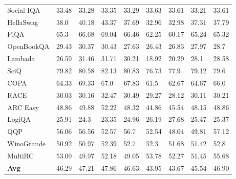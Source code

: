 \documentclass{article}
\theoremstyle{definition}
\theoremstyle{remark}
\begin{document}
\begin{table}[!ht]
\begin{tabular}{lllllllll}
        Social IQA & 33.48 & 33.28 & 33.35 & 33.29 & 33.63 & 33.61 & 33.21 & 33.61 \\ 
        HellaSwag & 38.0 & 40.18 & 43.37 & 37.69 & 32.96 & 32.98 & 37.31 & 37.79 \\ 
        PiQA & 65.3 & 66.68 & 69.04 & 66.46 & 62.25 & 60.17 & 65.24 & 65.32 \\ 
        OpenBookQA & 29.43 & 30.37 & 30.43 & 27.63 & 26.43 & 26.83 & 27.97 & 28.7 \\ 
        Lambada & 26.59 & 31.46 & 31.71 & 30.21 & 18.92 & 20.29 & 28.1 & 28.58 \\ 
        SciQ & 79.82 & 80.58 & 82.13 & 80.83 & 76.73 & 77.9 & 79.12 & 79.6 \\ 
        COPA & 64.33 & 69.33 & 67.0 & 67.83 & 61.5 & 62.67 & 64.67 & 66.0 \\ 
        RACE & 30.03 & 30.16 & 32.47 & 30.49 & 29.27 & 28.12 & 30.11 & 30.21 \\ 
        ARC Easy & 48.86 & 49.88 & 52.22 & 48.32 & 44.86 & 45.54 & 48.15 & 48.86 \\ 
        LogiQA & 25.91 & 24.3 & 23.35 & 24.96 & 26.19 & 27.68 & 25.47 & 25.37 \\ 
        QQP & 56.06 & 56.56 & 52.57 & 56.7 & 52.54 & 48.04 & 49.81 & 57.12 \\ 
        WinoGrande & 50.92 & 50.97 & 52.39 & 52.7 & 52.3 & 51.68 & 51.42 & 52.8 \\ 
        MultiRC & 53.09 & 49.97 & 52.18 & 49.05 & 53.78 & 52.27 & 51.45 & 55.68 \\ 
        \midrule
        \textbf{Avg} & 46.29 & 47.21 & 47.86 & 46.63 & 43.95 & 43.67 & 45.54 & 46.90 \\ \bottomrule
    \end{tabular}
\end{table}
\end{document}
